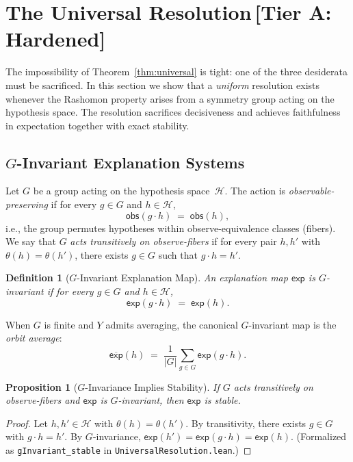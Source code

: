 \documentclass[11pt,a4paper]{article}
\newtheorem{definition}[theorem]{Definition}
\newtheorem{proposition}[theorem]{Proposition}
\newcommand{\sH}{\mathcal{H}}
\begin{document}
\section{The Universal Resolution\,\textnormal{\normalsize[Tier A: Hardened]}}
\label{sec:resolution}

The impossibility of Theorem~\ref{thm:universal} is tight: one of the three
desiderata must be sacrificed.  In this section we show that a \emph{uniform}
resolution exists whenever the Rashomon property arises from a symmetry group
acting on the hypothesis space.  The resolution sacrifices decisiveness and
achieves faithfulness in expectation together with exact stability.

\subsection[G-Invariant Explanation Systems]{$G$-Invariant Explanation Systems}
\label{sec:g-invariant}

Let $G$ be a group acting on the hypothesis space~$\sH$.  The action is
\emph{observable-preserving} if for every $g \in G$ and $h \in \sH$,
\[
  \mathsf{obs}(g \cdot h) \;=\; \mathsf{obs}(h),
\]
i.e., the group permutes hypotheses within observe-equivalence classes
(fibers).  We say that $G$ \emph{acts transitively on observe-fibers} if for
every pair $h, h'$ with $\theta(h) = \theta(h')$, there exists $g \in G$
such that $g \cdot h = h'$.

\begin{definition}[$G$-Invariant Explanation Map]
\label{def:g-invariant}
An explanation map $\mathsf{exp}$ is \emph{$G$-invariant} if for every
$g \in G$ and $h \in \sH$,
\[
  \mathsf{exp}(g \cdot h) \;=\; \mathsf{exp}(h).
\]
\end{definition}

When $G$ is finite and $Y$ admits averaging, the canonical $G$-invariant map
is the \emph{orbit average}:
\[
  \overline{\mathsf{exp}}(h) \;=\; \frac{1}{|G|}\sum_{g \in G} \mathsf{exp}(g \cdot h).
\]

\begin{proposition}[$G$-Invariance Implies Stability]
\label{prop:g-invariant-stable}
If $G$ acts transitively on observe-fibers and $\mathsf{exp}$ is
$G$-invariant, then $\mathsf{exp}$ is stable.
\end{proposition}

\begin{proof}
Let $h, h' \in \sH$ with $\theta(h) = \theta(h')$.  By transitivity, there
exists $g \in G$ with $g \cdot h = h'$.  By $G$-invariance,
$\mathsf{exp}(h') = \mathsf{exp}(g \cdot h) = \mathsf{exp}(h)$.
(Formalized as \texttt{gInvariant\_stable} in
\texttt{UniversalResolution.lean}.)
\end{proof}
\end{document}

